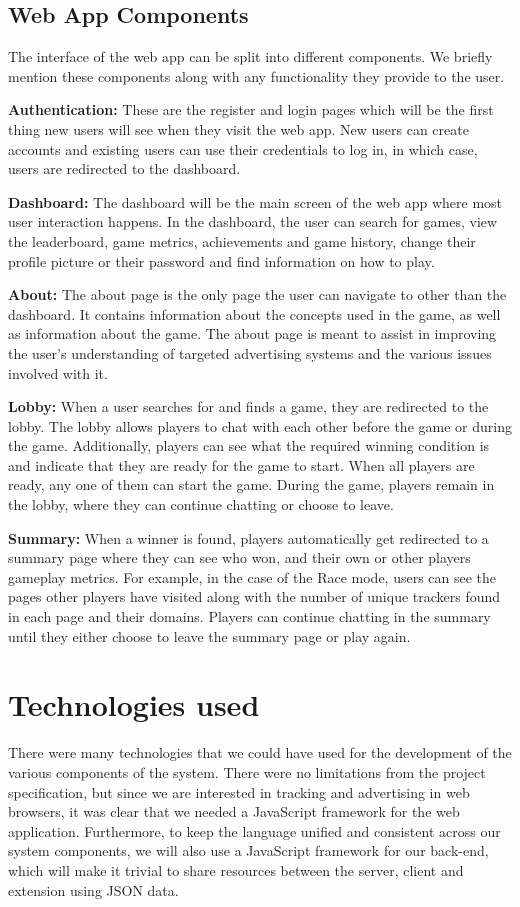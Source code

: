 \documentclass{l4proj}
\begin{document}
\subsection{Web App Components}
The interface of the web app can be split into different components. We briefly mention these components along with any functionality they provide to the user.

\textbf{Authentication:} These are the register and login pages which will be the first thing new users will see when they visit the web app. New users can create accounts and existing users can use their credentials to log in, in which case, users are redirected to the dashboard.

\textbf{Dashboard:} The dashboard will be the main screen of the web app where most user interaction happens. In the dashboard, the user can search for games, view the leaderboard, game metrics, achievements and game history, change their profile picture or their password and find information on how to play.

\textbf{About:} The about page is the only page the user can navigate to other than the dashboard. It contains information about the concepts used in the game, as well as information about the game. The about page is meant to assist in improving the user's understanding of targeted advertising systems and the various issues involved with it. 

\textbf{Lobby:} When a user searches for and finds a game, they are redirected to the lobby. The lobby allows players to chat with each other before the game or during the game. Additionally, players can see what the required winning condition is and indicate that they are ready for the game to start. When all players are ready, any one of them can start the game. During the game, players remain in the lobby, where they can continue chatting or choose to leave.

\textbf{Summary:} When a winner is found, players automatically get redirected to a summary page where they can see who won, and their own or other players gameplay metrics. For example, in the case of the Race mode, users can see the pages other players have visited along with the number of unique trackers found in each page and their domains. Players can continue chatting in the summary until they either choose to leave the summary page or play again. 

\section{Technologies used}
There were many technologies that we could have used for the development of the various components of the system. There were no limitations from the project specification, but since we are interested in tracking and 
advertising in web browsers, it was clear that we needed a JavaScript framework for the web application. Furthermore, to keep the language unified and consistent across our system components, we will also use a JavaScript framework for our
back-end, which will make it trivial to share resources between the server, client and extension using JSON data. 
\end{document}
